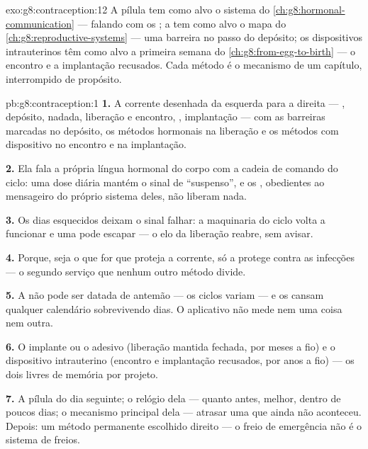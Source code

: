 \begin{solution}{exo:g8:contraception:12}
A pílula tem como alvo o sistema do
\cref{ch:g8:hormonal-communication} --- falando  com os
; a  tem como alvo o mapa do
\cref{ch:g8:reproductive-systems} --- uma barreira no passo do
depósito; os dispositivos intrauterinos têm como alvo a primeira
semana do \cref{ch:g8:from-egg-to-birth} --- o encontro e a implantação
recusados. Cada método é o mecanismo de um capítulo, interrompido de
propósito.
\end{solution}

\begin{solution}{pb:g8:contraception:1}
\textbf{1.} A corrente desenhada da esquerda para a direita ---
, depósito, nadada, liberação e encontro, ,
implantação --- com as barreiras marcadas no depósito, os métodos
hormonais na liberação e os métodos com dispositivo no encontro e na
implantação.

\textbf{2.} Ela fala a própria língua hormonal do corpo com a cadeia
de comando do ciclo: uma dose diária mantém o sinal de ``suspenso'', e
os , obedientes ao mensageiro do próprio sistema deles, não
liberam nada.

\textbf{3.} Os dias esquecidos deixam o sinal falhar: a maquinaria do
ciclo volta a funcionar e uma  pode escapar --- o elo da
liberação reabre, sem avisar.

\textbf{4.} Porque, seja o que for que proteja a corrente, só a
 protege contra as infecções --- o segundo serviço que nenhum
outro método divide.

\textbf{5.} A  não pode ser datada de antemão --- os ciclos
variam --- e os  cansam qualquer calendário
sobrevivendo dias. O aplicativo não mede nem uma coisa nem outra.

\textbf{6.} O implante ou o adesivo (liberação mantida fechada, por
meses a fio) e o dispositivo intrauterino (encontro e implantação
recusados, por anos a fio) --- os dois livres de memória por projeto.

\textbf{7.} A pílula do dia seguinte; o relógio dela --- quanto antes,
melhor, dentro de poucos dias; o mecanismo principal dela --- atrasar
uma  que ainda não aconteceu. Depois: um método permanente
escolhido direito --- o freio de emergência não é o sistema de freios.


\end{solution}

